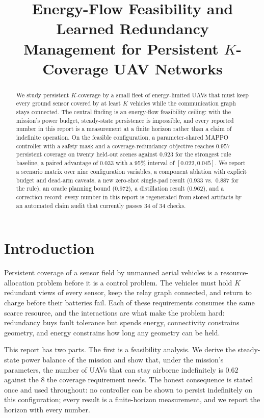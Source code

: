 \documentclass[conference]{IEEEtran}
\title{Energy-Flow Feasibility and Learned Redundancy\\Management for Persistent $K$-Coverage UAV Networks}
\author{\IEEEauthorblockN{Himanshu Nagwanshi, Surya Prakash S, Harsh Varshney, Gaddam Viswavijith}
\IEEEauthorblockA{Department of Computer Science and Engineering\\
Indian Institute of Technology Dharwad, Dharwad, India\\
CS24BT055@iitdh.ac.in, CS23BT068@iitdh.ac.in, cs23bt004@iitdh.ac.in, CS23BT076@iitdh.ac.in}}
\begin{document}
\maketitle

\begin{abstract}
We study persistent $K$-coverage by a small fleet of energy-limited UAVs that must keep every ground sensor covered by at least $K$ vehicles while the communication graph stays connected. The central finding is an energy-flow feasibility ceiling: with the mission's power budget, steady-state persistence is impossible, and every reported number in this report is a measurement at a finite horizon rather than a claim of indefinite operation. On the feasible configuration, a parameter-shared MAPPO controller with a safety mask and a coverage-redundancy objective reaches $0.957$ persistent coverage on twenty held-out scenes against $0.923$ for the strongest rule baseline, a paired advantage of $0.033$ with a 95\% interval of $[0.022, 0.045]$. We report a scenario matrix over nine configuration variables, a component ablation with explicit budget and dead-arm caveats, a new zero-shot single-pad result ($0.933$ vs.\ $0.887$ for the rule), an oracle planning bound ($0.972$), a distillation result ($0.962$), and a correction record: every number in this report is regenerated from stored artifacts by an automated claim audit that currently passes 34 of 34 checks.
\end{abstract}

\section{Introduction}
Persistent coverage of a sensor field by unmanned aerial vehicles is a resource-allocation problem before it is a control problem. The vehicles must hold $K$ redundant views of every sensor, keep the relay graph connected, and return to charge before their batteries fail. Each of these requirements consumes the same scarce resource, and the interactions are what make the problem hard: redundancy buys fault tolerance but spends energy, connectivity constrains geometry, and energy constrains how long any geometry can be held.

This report has two parts. The first is a feasibility analysis. We derive the steady-state power balance of the mission and show that, under the mission's parameters, the number of UAVs that can stay airborne indefinitely is $0.62$ against the $8$ the coverage requirement needs. The honest consequence is stated once and used throughout: no controller can be shown to persist indefinitely on this configuration; every result is a finite-horizon measurement, and we report the horizon with every number.
\end{document}
